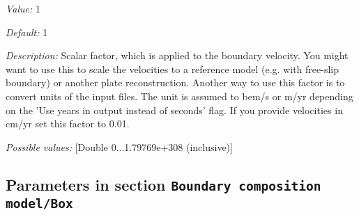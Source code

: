 \begin{itemize}
{\it Value:} 1


{\it Default:} 1


{\it Description:} Scalar factor, which is applied to the boundary velocity. You might want to use this to scale the velocities to a reference model (e.g. with free-slip boundary) or another plate reconstruction. Another way to use this factor is to convert units of the input files. The unit is assumed to bem/s or m/yr depending on the 'Use years in output instead of seconds' flag. If you provide velocities in cm/yr set this factor to 0.01.


{\it Possible values:} [Double 0...1.79769e+308 (inclusive)]
\end{itemize}

\subsection{Parameters in section \tt Boundary composition model/Box}
\label{parameters:Boundary_20composition_20model/Box}

